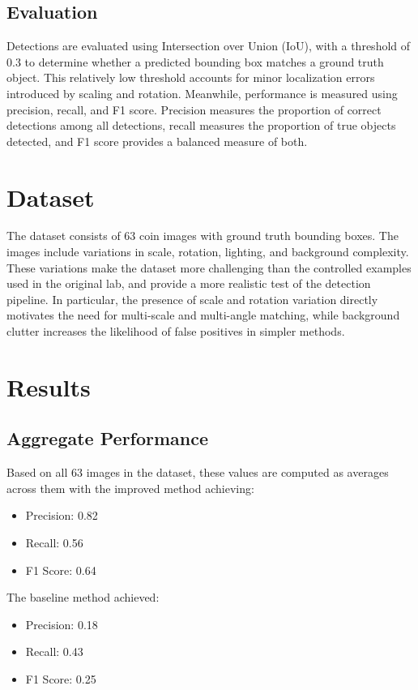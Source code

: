 \documentclass[11pt, letterpaper, twoside]{article}
\begin{document}
\subsection{Evaluation}

Detections are evaluated using Intersection over Union (IoU), with a threshold of 0.3 to determine whether a predicted bounding box matches a ground truth object. This relatively low threshold accounts for minor localization errors introduced by scaling and rotation. Meanwhile, performance is measured using precision, recall, and F1 score. Precision measures the proportion of correct detections among all detections, recall measures the proportion of true objects detected, and F1 score provides a balanced measure of both.

\section{Dataset}

The dataset consists of 63 coin images with ground truth bounding boxes. The images include variations in scale, rotation, lighting, and background complexity. These variations make the dataset more challenging than the controlled examples used in the original lab, and provide a more realistic test of the detection pipeline. In particular, the presence of scale and rotation variation directly motivates the need for multi-scale and multi-angle matching, while background clutter increases the likelihood of false positives in simpler methods.
\section{Results}

\subsection{Aggregate Performance}

Based on all 63 images in the dataset, these values are computed as averages across them with the improved method achieving:

\begin{itemize}
    \item Precision: 0.82
    \item Recall: 0.56
    \item F1 Score: 0.64
\end{itemize}

The baseline method achieved:

\begin{itemize}
    \item Precision: 0.18
    \item Recall: 0.43
    \item F1 Score: 0.25
\end{itemize}
\end{document}
